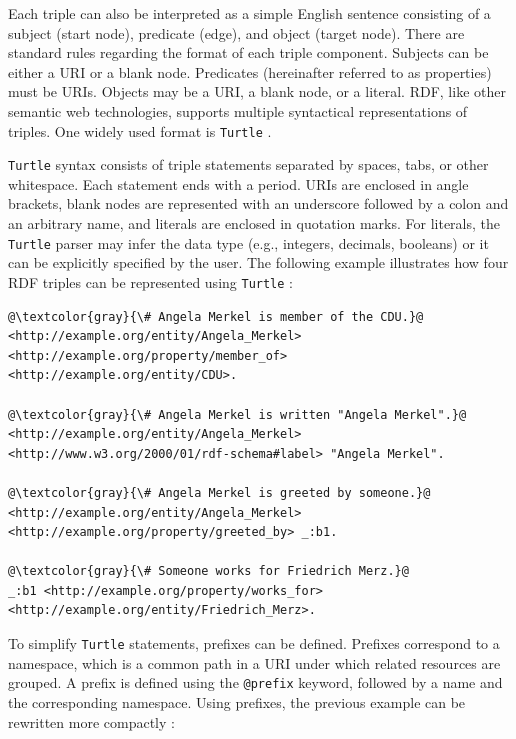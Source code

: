 \documentclass[a4paper,oneside,bibliography=totoc]{scrbook}
\begin{document}
Each triple can also be interpreted as a simple English sentence consisting of a subject (start node), predicate (edge), and object (target node). There are standard rules regarding the format of each triple component. Subjects can be either a \ac{URI} or a blank node. Predicates (hereinafter referred to as properties) must be \acp{URI}. Objects may be a \ac{URI}, a blank node, or a literal. \Ac{RDF}, like other semantic web technologies, supports multiple syntactical representations of triples. One widely used format is \texttt{Turtle} \cite{VillazonTerrazas2017}.

\texttt{Turtle} syntax consists of triple statements separated by spaces, tabs, or other whitespace. Each statement ends with a period. \acp{URI} are enclosed in angle brackets, blank nodes are represented with an underscore followed by a colon and an arbitrary name, and literals are enclosed in quotation marks. For literals, the \texttt{Turtle} parser may infer the data type (e.g., integers, decimals, booleans) or it can be explicitly specified by the user. The following example illustrates how four RDF triples can be represented using \texttt{Turtle} \cite{Tomaszuk2020}:

\begin{lstlisting}[language=Turtle, caption=Example of a Knowledge Graph in \texttt{Turtle} Format, label=lst:turtle_example, escapechar=@]
@\textcolor{gray}{\# Angela Merkel is member of the CDU.}@
<http://example.org/entity/Angela_Merkel> <http://example.org/property/member_of> <http://example.org/entity/CDU>.

@\textcolor{gray}{\# Angela Merkel is written "Angela Merkel".}@
<http://example.org/entity/Angela_Merkel> <http://www.w3.org/2000/01/rdf-schema#label> "Angela Merkel".

@\textcolor{gray}{\# Angela Merkel is greeted by someone.}@
<http://example.org/entity/Angela_Merkel> <http://example.org/property/greeted_by> _:b1.

@\textcolor{gray}{\# Someone works for Friedrich Merz.}@
_:b1 <http://example.org/property/works_for> <http://example.org/entity/Friedrich_Merz>.
\end{lstlisting}

\pagebreak

To simplify \texttt{Turtle} statements, prefixes can be defined. Prefixes correspond to a namespace, which is a common path in a \ac{URI} under which related resources are grouped. A prefix is defined using the \texttt{@prefix} keyword, followed by a name and the corresponding namespace. Using prefixes, the previous example can be rewritten more compactly \cite{Tomaszuk2020}:
\end{document}
